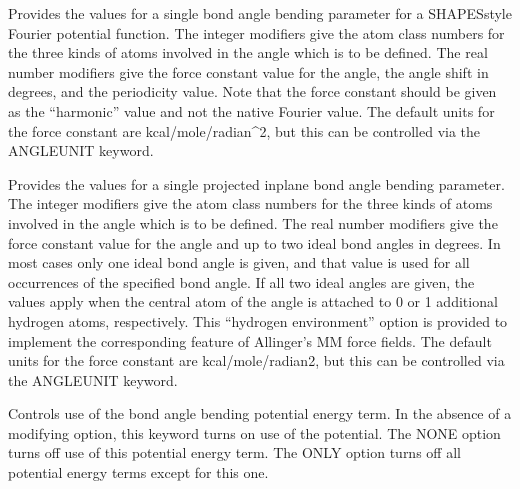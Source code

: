 \documentclass[letterpaper,11pt,english]{sphinxmanual}
\begin{document}
\ignorespaces {}\label{\detokenize{text/keywords:key-anglef}}\begin{description}
\sphinxAtStartPar
Provides the values for a single bond angle bending parameter for a SHAPES\sphinxhyphen{}style Fourier potential function. The integer modifiers give the atom class numbers for the three kinds of atoms involved in the angle which is to be defined. The real number modifiers give the force constant value for the angle, the angle shift in degrees, and the periodicity value. Note that the force constant should be given as the “harmonic” value and not the native Fourier value. The default units for the force constant are kcal/mole/radian\textasciicircum{}2, but this can be controlled via the ANGLEUNIT keyword.

\end{description}

\ignorespaces {}\label{\detokenize{text/keywords:key-anglep}}\begin{description}
\sphinxAtStartPar
Provides the values for a single projected in\sphinxhyphen{}plane bond angle bending parameter. The integer modifiers give the atom class numbers for the three kinds of atoms involved in the angle which is to be defined. The real number modifiers give the force constant value for the angle and up to two ideal bond angles in degrees. In most cases only one ideal bond angle is given, and that value is used for all occurrences of the specified bond angle. If all two ideal angles are given, the values apply when the central atom of the angle is attached to 0 or 1 additional hydrogen atoms, respectively. This “hydrogen environment” option is provided to implement the corresponding feature of Allinger’s MM force fields. The default units for the force constant are kcal/mole/radian2, but this can be controlled via the ANGLEUNIT keyword.

\end{description}

\ignorespaces {}\label{\detokenize{text/keywords:key-angleterm}}\begin{description}
\sphinxAtStartPar
Controls use of the bond angle bending potential energy term. In the absence of a modifying option, this keyword turns on use of the potential. The NONE option turns off use of this potential energy term. The ONLY option turns off all potential energy terms except for this one.

\end{description}
\end{document}
